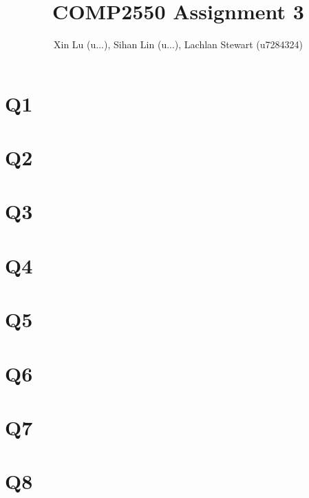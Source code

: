 \documentclass[]{article}
\title{COMP2550 Assignment 3}
\author{Xin Lu (u...), Sihan Lin (u...), Lachlan Stewart (u7284324)}
\begin{document}
	
	\maketitle
	
	\pagebreak
	\section{Q1}
	
	\pagebreak	
	\section{Q2}
	
	\pagebreak
	\section{Q3}
	
	\pagebreak
	\section{Q4}
	
	\pagebreak
	\section{Q5}
	
	\pagebreak
	\section{Q6}
	
	\pagebreak
	\section{Q7}
	
	\pagebreak
	\section{Q8}
	
	
	
\end{document}
